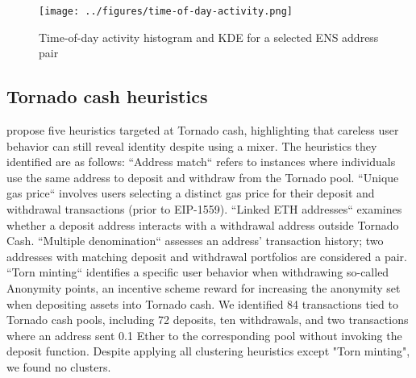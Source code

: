\documentclass[12pt,a4paper,titlepage,oneside,english]{article}
\begin{document}
\begin{figure}[h!]
	\centering
	\texttt{[image: ../figures/time-of-day-activity.png]}
	\caption{Time-of-day activity histogram and KDE for a selected ENS address pair}
	\label{fig:ToD}
\end{figure} 

\subsection{Tornado cash heuristics}
\cite{wu2022tutela} propose five heuristics targeted at Tornado cash, highlighting that careless user behavior can still reveal identity despite using a mixer. The heuristics they identified are as follows: \newline
``Address match`` refers to instances where individuals use the same address to deposit and withdraw from the Tornado pool. ``Unique gas price`` involves users selecting a distinct gas price for their deposit and withdrawal transactions (prior to EIP-1559). ``Linked ETH addresses`` examines whether a deposit address interacts with a withdrawal address outside Tornado Cash. ``Multiple denomination`` assesses an address' transaction history; two addresses with matching deposit and withdrawal portfolios are considered a pair. ``Torn minting`` identifies a specific user behavior when withdrawing so-called Anonymity points, an incentive scheme reward for increasing the anonymity set when depositing assets into Tornado cash.\newline
We identified 84 transactions tied to Tornado cash pools, including 72 deposits, ten withdrawals, and two transactions where an address sent 0.1 Ether to the corresponding pool without invoking the deposit function.  Despite applying all clustering heuristics except "Torn minting", we found no clusters.
\end{document}
